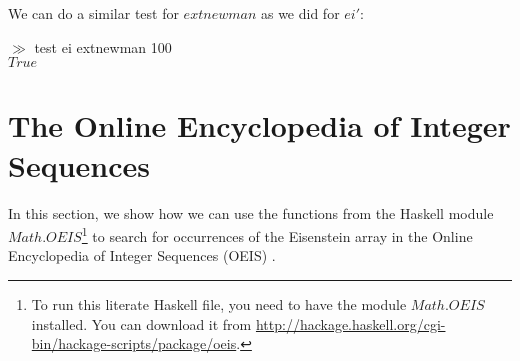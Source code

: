 \documentclass[leqno,fleqn,12pt]{article}
\newcommand{\Conid}[1]{\mathit{#1}}
\newcommand{\Varid}[1]{\mathit{#1}}
\def\prompt#1{\noindent$\gg$ #1}
\begin{document}
We can do a similar test for \ensuremath{\Varid{extnewman}} as we did for \ensuremath{\Varid{ei'}}:

\medskip
\prompt{test ei extnewman 100}\\
\ensuremath{\Conid{True}} %

\section{The Online Encyclopedia of Integer Sequences} In this
section, we show how we can use the functions from the Haskell module
\ensuremath{\Conid{\Conid{Math}.OEIS}}\footnote{To run this literate Haskell file, you need to
have the module \ensuremath{\Conid{\Conid{Math}.OEIS}} installed. You can download it from
\url{http://hackage.haskell.org/cgi-bin/hackage-scripts/package/oeis}.}
to search for occurrences of the Eisenstein array in the Online
Encyclopedia of Integer Sequences (OEIS) \cite{sloane-integers}.
\end{document}
